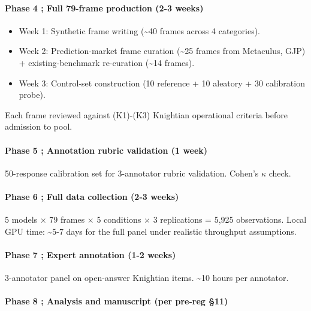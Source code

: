 \documentclass{article}
\providecommand{\tightlist}{\setlength{\itemsep}{0pt}\setlength{\parskip}{0pt}}
\begin{document}
\paragraph{Phase 4 ; Full 79-frame production (2-3
weeks)}\label{phase-4-full-79-frame-production-2-3-weeks}

\begin{itemize}
\tightlist
\item
  Week 1: Synthetic frame writing (\textasciitilde40 frames across 4
  categories).
\item
  Week 2: Prediction-market frame curation (\textasciitilde25 frames
  from Metaculus, GJP) + existing-benchmark re-curation
  (\textasciitilde14 frames).
\item
  Week 3: Control-set construction (10 reference + 10 aleatory + 30
  calibration probe).
\end{itemize}

Each frame reviewed against (K1)-(K3) Knightian operational criteria
before admission to pool.

\paragraph{Phase 5 ; Annotation rubric validation (1
week)}\label{phase-5-annotation-rubric-validation-1-week}

50-response calibration set for 3-annotator rubric validation. Cohen's
\(\kappa\) check.

\paragraph{Phase 6 ; Full data collection (2-3
weeks)}\label{phase-6-full-data-collection-2-3-weeks}

5 models \ensuremath{\times} 79 frames \ensuremath{\times} 5 conditions \ensuremath{\times} 3 replications = 5,925
observations. Local GPU time: \textasciitilde5-7 days for the full panel
under realistic throughput assumptions.

\paragraph{Phase 7 ; Expert annotation (1-2
weeks)}\label{phase-7-expert-annotation-1-2-weeks}

3-annotator panel on open-answer Knightian items. \textasciitilde10
hours per annotator.

\paragraph{Phase 8 ; Analysis and manuscript (per pre-reg
\S{}11)}\label{phase-8-analysis-and-manuscript-per-pre-reg-11}
\end{document}
